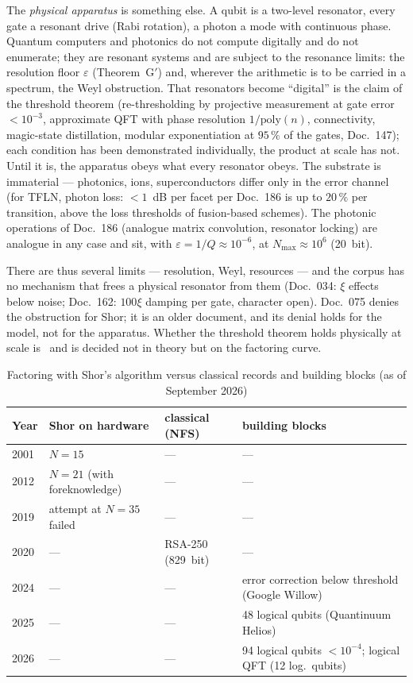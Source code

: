 The \emph{physical apparatus} is something else. A qubit is a two-level
resonator, every gate a resonant drive (Rabi rotation), a photon a mode with
continuous phase. Quantum computers and photonics do not compute digitally and
do not enumerate; they are resonant systems and are subject to the resonance
limits: the resolution floor $\varepsilon$ (Theorem~G$'$) and, wherever the
arithmetic is to be carried in a spectrum, the Weyl obstruction. That resonators
become ``digital'' is the claim of the threshold theorem (re-thresholding by
projective measurement at gate error $<10^{-3}$, approximate QFT with phase
resolution $1/\mathrm{poly}(n)$, connectivity, magic-state distillation,
modular exponentiation at $95\,\%$ of the gates, Doc.~147); each condition has
been demonstrated individually, the product at scale has not. Until it is, the
apparatus obeys what every resonator obeys. The substrate is immaterial ---
photonics, ions, superconductors differ only in the error channel (for TFLN,
photon loss: $<1$~dB per facet per Doc.~186 is up to $20\,\%$ per transition,
above the loss thresholds of fusion-based schemes). The photonic operations of
Doc.~186 (analogue matrix convolution, resonator locking) are analogue in any
case and sit, with $\varepsilon = 1/Q \approx 10^{-6}$, at
$N_\mathrm{max}\approx10^{6}$ (20~bit).

There are thus several limits --- resolution, Weyl, resources --- and the corpus
has no mechanism that frees a physical resonator from them (Doc.~034: $\xi$
effects below noise; Doc.~162: $100\xi$ damping per gate, character open).
Doc.~075 denies the obstruction for Shor; it is an older document, and its
denial holds for the model, not for the apparatus. Whether the threshold
theorem holds physically at scale is \SM\ and is decided not in theory but on
the factoring curve.

\begin{table}[H]
\centering
\caption{Factoring with Shor's algorithm versus classical records and building blocks (as of September 2026)}
\begin{tabular}{llll}
\toprule
Year & Shor on hardware & classical (NFS) & building blocks \\
\midrule
2001 & $N=15$ & --- & --- \\
2012 & $N=21$ (with foreknowledge) & --- & --- \\
2019 & attempt at $N=35$ failed & --- & --- \\
2020 & --- & RSA-250 (829~bit) & --- \\
2024 & --- & --- & error correction below threshold (Google Willow) \\
2025 & --- & --- & 48 logical qubits (Quantinuum Helios) \\
2026 & --- & --- & 94 logical qubits $<10^{-4}$; logical QFT (12 log.\ qubits) \\
\bottomrule
\end{tabular}
\end{table}

